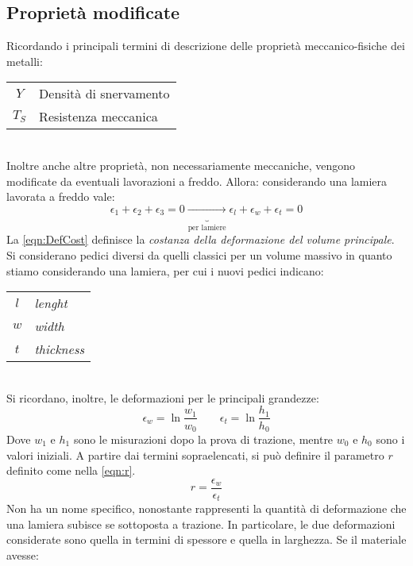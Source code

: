 \subsection{Proprietà modificate}
Ricordando i principali termini di descrizione delle proprietà meccanico-fisiche dei metalli:\\
\begin{tabular}{cl}
$Y$ & Densità di snervamento\\
$T_S$& Resistenza meccanica\\
\end{tabular}
\\
Inoltre anche altre proprietà, non necessariamente meccaniche, vengono modificate da eventuali lavorazioni a freddo.
Allora: considerando una lamiera lavorata a freddo vale:
\begin{equation}
\epsilon_1 + \epsilon_2 + \epsilon_3 = 0 \underbrace{\rightarrow}_{\text{per lamiere}}
\epsilon_l + \epsilon_w + \epsilon_t = 0 
\label{eqn:DefCost}
\end{equation}
La \ref{eqn:DefCost} definisce la \emph{costanza della deformazione del volume principale}.
Si considerano pedici diversi da quelli classici per un volume massivo in quanto stiamo considerando una lamiera, per cui i nuovi pedici indicano:\\
\begin{tabular}{cl}
$l$ & \textit{lenght}\\
$w$ & \textit{width}\\
$t$ & \textit{thickness}\\
\end{tabular}
\\
Si ricordano, inoltre, le deformazioni per le principali grandezze:
\begin{equation}
\epsilon_w = \ln{\frac{w_1}{w_0}} \qquad \epsilon_t = \ln{\frac{h_1}{h_0}}
\label{eqn:DefPrinc}
\end{equation}
Dove $w_1$ e $h_1$ sono le misurazioni dopo la prova di trazione, mentre $w_0$ e $h_0$ sono i valori iniziali.
A partire dai termini sopraelencati, si può definire il parametro $r$ definito come nella \ref{eqn:r}.
\begin{equation}
r = \frac{\epsilon_w}{\epsilon_t}
\label{eqn:r}
\end{equation}
Non ha un nome specifico, nonostante rappresenti la quantità di deformazione che una lamiera subisce se sottoposta a trazione.
In particolare, le due deformazioni considerate sono quella in termini di spessore e quella in larghezza.
Se il materiale avesse:

